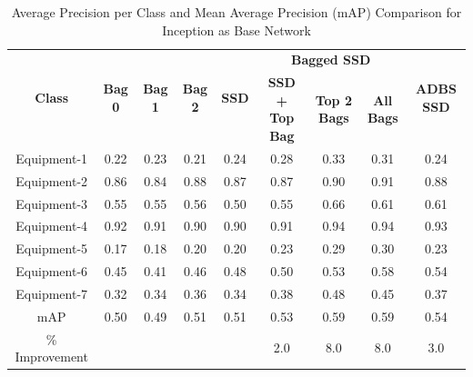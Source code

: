 \documentclass[conference]{IEEEtran}
\begin{document}
\begin{table}
\centering
\caption{Average Precision per Class and Mean Average Precision (mAP) Comparison for Inception as Base Network}
\label{inceptiontable}
\begin{tabular}{|c|c|c|c|c|c|c|c|c|}
\hline
\multirow{2}{*}{\textbf{Class}} & \multirow{2}{*}{\textbf{Bag 0}} & \multirow{2}{*}{\textbf{Bag 1}} & \multirow{2}{*}{\textbf{Bag 2}} & \multirow{2}{*}{\textbf{SSD}} & \multicolumn{3}{c|}{\textbf{Bagged SSD}}	& \multirow{2}{*}{\textbf{ADBS SSD}} \\ \cline{6-8}	& 		&		&		&		& \textbf{SSD + Top Bag} & \textbf{Top 2 Bags} & \textbf{All Bags} &	\\ \hline
Equipment-1		& 0.22		& 0.23		& 0.21		& 0.24		& 0.28		& 0.33		& 0.31		& 0.24\\ \hline
Equipment-2		& 0.86		& 0.84		& 0.88		& 0.87		& 0.87		& 0.90		& 0.91		& 0.88\\ \hline
Equipment-3		& 0.55		& 0.55		& 0.56		& 0.50		& 0.55		& 0.66		& 0.61		& 0.61\\ \hline
Equipment-4		& 0.92		& 0.91		& 0.90		& 0.90		& 0.91		& 0.94		& 0.94		& 0.93\\ \hline
Equipment-5		& 0.17		& 0.18		& 0.20		& 0.20		& 0.23		& 0.29		& 0.30		& 0.23\\ \hline
Equipment-6		& 0.45		& 0.41		& 0.46		& 0.48		& 0.50		& 0.53		& 0.58		& 0.54\\ \hline
Equipment-7		& 0.32		& 0.34		& 0.36		& 0.34		& 0.38		& 0.48		& 0.45		& 0.37\\ \hline
mAP				& 0.50		& 0.49		& 0.51		& 0.51		& 0.53		& 0.59		& 0.59		& 0.54\\ \hline
\% Improvement	& \multicolumn{4}{c|}{}							& 2.0		& 8.0		& 8.0		& 3.0\\ \hline
\end{tabular}
\end{table}
\end{document}
